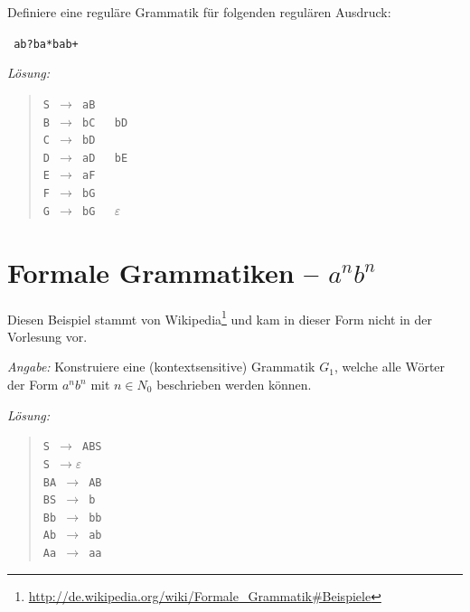 \documentclass[11pt,a4paper]{article}
\theoremstyle{area}
\begin{document}
Definiere eine reguläre Grammatik für folgenden regulären Ausdruck:

\begin{center}
    \texttt{ ab?ba*bab+ }
\end{center}

\emph{Lösung:}

\begin{quote}
    \texttt{S $\rightarrow$ aB \\
      B $\rightarrow$ bC \textbar\, bD \\
      C $\rightarrow$ bD \\
      D $\rightarrow$ aD \textbar\, bE \\
      E $\rightarrow$ aF \\
      F $\rightarrow$ bG \\
      G $\rightarrow$ bG \textbar\, $\varepsilon$
    }
\end{quote}

\section{Formale Grammatiken -- $a^nb^n$}

Diesen Beispiel stammt von
Wikipedia\footnote{\url{http://de.wikipedia.org/wiki/Formale\_Grammatik\#Beispiele}}
und kam in dieser Form nicht in der Vorlesung vor.

\emph{Angabe:} Konstruiere eine (kontextsensitive) Grammatik $G_1$, welche
    alle Wörter der Form $a^nb^n$ mit $n\in N_0$ beschrieben werden können.

\emph{Lösung:}
\begin{quote}
    \texttt{S $\rightarrow$ ABS \\
      S $\rightarrow \varepsilon$ \\
      BA $\rightarrow$ AB \\
      BS $\rightarrow$ b \\
      Bb $\rightarrow$ bb \\
      Ab $\rightarrow$ ab \\
      Aa $\rightarrow$ aa
    }
\end{quote}
\end{document}
